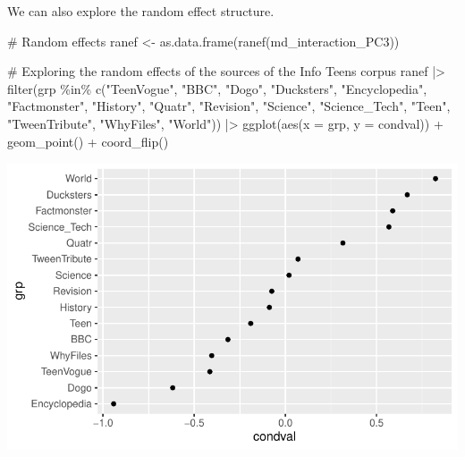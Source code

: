 \documentclass[
  letterpaper,
  DIV=11,
  numbers=noendperiod]{scrreprt}
\newenvironment{Shaded}{\begin{snugshade}}{\end{snugshade}}
\newcommand{\AttributeTok}[1]{\textcolor[rgb]{0.40,0.45,0.13}{#1}}
\newcommand{\CommentTok}[1]{\textcolor[rgb]{0.37,0.37,0.37}{#1}}
\newcommand{\FunctionTok}[1]{\textcolor[rgb]{0.28,0.35,0.67}{#1}}
\newcommand{\NormalTok}[1]{\textcolor[rgb]{0.00,0.23,0.31}{#1}}
\newcommand{\OtherTok}[1]{\textcolor[rgb]{0.00,0.23,0.31}{#1}}
\newcommand{\SpecialCharTok}[1]{\textcolor[rgb]{0.37,0.37,0.37}{#1}}
\newcommand{\StringTok}[1]{\textcolor[rgb]{0.13,0.47,0.30}{#1}}
\begin{document}
We can also explore the random effect structure.

\begin{Shaded}
\begin{Highlighting}[]
\CommentTok{\# Random effects}
\NormalTok{ranef }\OtherTok{\textless{}{-}} \FunctionTok{as.data.frame}\NormalTok{(}\FunctionTok{ranef}\NormalTok{(md\_interaction\_PC3))}

\CommentTok{\# Exploring the random effects of the sources of the Info Teens corpus}
\NormalTok{ranef }\SpecialCharTok{|\textgreater{}} 
  \FunctionTok{filter}\NormalTok{(grp }\SpecialCharTok{\%in\%} \FunctionTok{c}\NormalTok{(}\StringTok{"TeenVogue"}\NormalTok{, }\StringTok{"BBC"}\NormalTok{, }\StringTok{"Dogo"}\NormalTok{, }\StringTok{"Ducksters"}\NormalTok{, }\StringTok{"Encyclopedia"}\NormalTok{, }\StringTok{"Factmonster"}\NormalTok{, }\StringTok{"History"}\NormalTok{, }\StringTok{"Quatr"}\NormalTok{, }\StringTok{"Revision"}\NormalTok{, }\StringTok{"Science"}\NormalTok{, }\StringTok{"Science\_Tech"}\NormalTok{, }\StringTok{"Teen"}\NormalTok{, }\StringTok{"TweenTribute"}\NormalTok{, }\StringTok{"WhyFiles"}\NormalTok{, }\StringTok{"World"}\NormalTok{)) }\SpecialCharTok{|\textgreater{}} 
  \FunctionTok{ggplot}\NormalTok{(}\FunctionTok{aes}\NormalTok{(}\AttributeTok{x =}\NormalTok{ grp, }\AttributeTok{y =}\NormalTok{ condval)) }\SpecialCharTok{+}
  \FunctionTok{geom\_point}\NormalTok{() }\SpecialCharTok{+}
  \FunctionTok{coord\_flip}\NormalTok{()}
\end{Highlighting}
\end{Shaded}

\includegraphics{AppendixH_files/figure-pdf/unnamed-chunk-17-1.pdf}

\begin{Shaded}
\end{Shaded}
\end{document}
